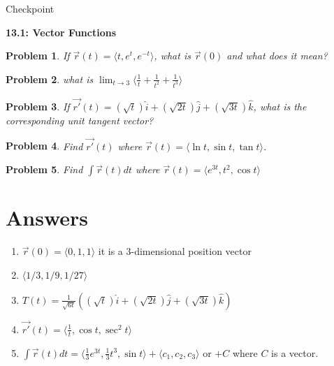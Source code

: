 \documentclass[11pt]{article}
\newtheorem{problem}{Problem}
\newcommand{\vs}{\vspace*{.1in}}
\begin{document}
\begin{huge}
    \begin{center}
        Checkpoint
    \end{center}
\end{huge}
\begin{large}\begin{center}\bf 13.1: Vector Functions\end{center}
\end{large}

\vs\vs

\begin{problem}
If $\vec{r}(t) = \langle t, e^t, e^{-t} \rangle$, what is $\vec{r}(0)$ and what does it mean?  
\end{problem}

\begin{problem}
what is $\lim_{t\to 3} \langle \frac{1}{t}+\frac{1}{t^2}+\frac{1}{t^3}\rangle$
\end{problem}

\begin{problem}
If $\vec{r'}(t) = (\sqrt{t})\hat{i}+(\sqrt{2t})\hat{j}+(\sqrt{3t})\hat{k}$, what is the corresponding unit tangent vector?
\end{problem}


\begin{problem}
Find $\vec{r'}(t)$ where $\vec{r}(t) = \langle \ln{t}, \sin{t}, \tan{t}\rangle$.
\end{problem}

\begin{problem}
Find $\int \vec{r}(t) dt$ where $\vec{r}(t) = \langle e^{3t}, t^2, \cos{t} \rangle$
\end{problem}


\newpage

\section{Answers}

\begin{enumerate}
    \item $\vec{r}(0) = \langle 0,1,1 \rangle$ it is a $3$-dimensional position vector
    \item $\langle 1/3,1/9,1/27\rangle$
    \item $T(t) = \frac{1}{\sqrt{6t}}((\sqrt{t})\hat{i}+(\sqrt{2t})\hat{j}+(\sqrt{3t})\hat{k})$
    \item $\vec{r'}(t) = \langle \frac{1}{t}, \cos{t}, \sec^2{t}\rangle $
    \item $\int \vec{r}(t) dt = \langle \frac{1}{3}e^{3t}, \frac{1}{3}t^3, \sin{t} \rangle + \langle c_1, c_2, c_3 \rangle$ or $+C$ where $C$ is a vector.
\end{enumerate}
\end{document}
